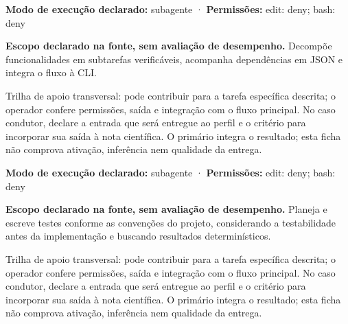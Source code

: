 \begin{arquitetura}
\textbf{Modo de execução declarado:} subagente · \textbf{Permissões:} edit: deny; bash: deny
\end{arquitetura}


\begin{descricao}
\textbf{Escopo declarado na fonte, sem avaliação de desempenho.}
Decompõe funcionalidades em subtarefas verificáveis, acompanha dependências em JSON e integra o fluxo à CLI.
\end{descricao}

\begin{funcao}
Trilha de apoio transversal: pode contribuir para a tarefa específica descrita; o operador confere permissões, saída e integração com o fluxo principal. No caso condutor, declare a entrada que será entregue ao perfil e o critério para incorporar sua saída à nota científica. O primário integra o resultado; esta ficha não comprova ativação, inferência nem qualidade da entrega.
\end{funcao}

\begin{arquitetura}
\textbf{Modo de execução declarado:} subagente · \textbf{Permissões:} edit: deny; bash: deny
\end{arquitetura}


\begin{descricao}
\textbf{Escopo declarado na fonte, sem avaliação de desempenho.}
Planeja e escreve testes conforme as convenções do projeto, considerando a testabilidade antes da implementação e buscando resultados determinísticos.
\end{descricao}

\begin{funcao}
Trilha de apoio transversal: pode contribuir para a tarefa específica descrita; o operador confere permissões, saída e integração com o fluxo principal. No caso condutor, declare a entrada que será entregue ao perfil e o critério para incorporar sua saída à nota científica. O primário integra o resultado; esta ficha não comprova ativação, inferência nem qualidade da entrega.
\end{funcao}

